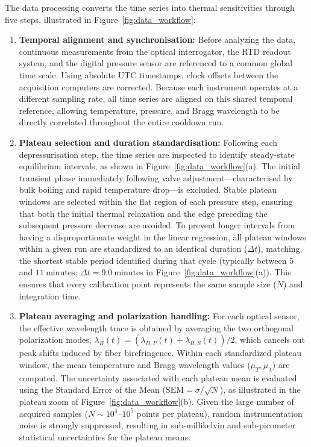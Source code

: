 \documentclass[preprint,11pt]{elsarticle}
\begin{document}
The data processing converts the time series into thermal sensitivities through five steps, illustrated in Figure~\ref{fig:data_workflow}:

\begin{enumerate}
    \item \textbf{Temporal alignment and synchronisation:}
    Before analyzing the data, continuous measurements from the optical interrogator, the RTD readout system, and the digital pressure sensor are referenced to a common global time scale. Using absolute UTC timestamps, clock offsets between the acquisition computers are corrected. Because each instrument operates at a different sampling rate, all time series are aligned on this shared temporal reference, allowing temperature, pressure, and Bragg wavelength to be directly correlated throughout the entire cooldown run.

    \item \textbf{Plateau selection and duration standardisation:}
    Following each depressurisation step, the time series are inspected to identify steady-state equilibrium intervals, as shown in Figure~\ref{fig:data_workflow}(a). The initial transient phase immediately following valve adjustment---characterised by bulk boiling and rapid temperature drop---is excluded. Stable plateau windows are selected within the flat region of each pressure step, ensuring that both the initial thermal relaxation and the edge preceding the subsequent pressure decrease are avoided. To prevent longer intervals from having a disproportionate weight in the linear regression, all plateau windows within a given run are standardized to an identical duration ($\Delta t$), matching the shortest stable period identified during that cycle (typically between $5$ and $11~\text{minutes}$; $\Delta t = 9.0~\text{minutes}$ in Figure~\ref{fig:data_workflow}(a)). This ensures that every calibration point represents the same sample size ($N$) and integration time.

    \item \textbf{Plateau averaging and polarization handling:}
    For each optical sensor, the effective wavelength trace is obtained by averaging the two orthogonal polarization modes, $\lambda_B(t) = (\lambda_{B,P}(t) + \lambda_{B,S}(t))/2$, which cancels out peak shifts induced by fiber birefringence. Within each standardized plateau window, the mean temperature and Bragg wavelength values ($\mu_T, \mu_\lambda$) are computed. The uncertainty associated with each plateau mean is evaluated using the Standard Error of the Mean ($\text{SEM} = \sigma / \sqrt{N}$), as illustrated in the plateau zoom of Figure~\ref{fig:data_workflow}(b). Given the large number of acquired samples ($N \sim 10^4$--$10^5$ points per plateau), random instrumentation noise is strongly suppressed, resulting in sub-millikelvin and sub-picometer statistical uncertainties for the plateau means.


\end{enumerate}
\end{document}
